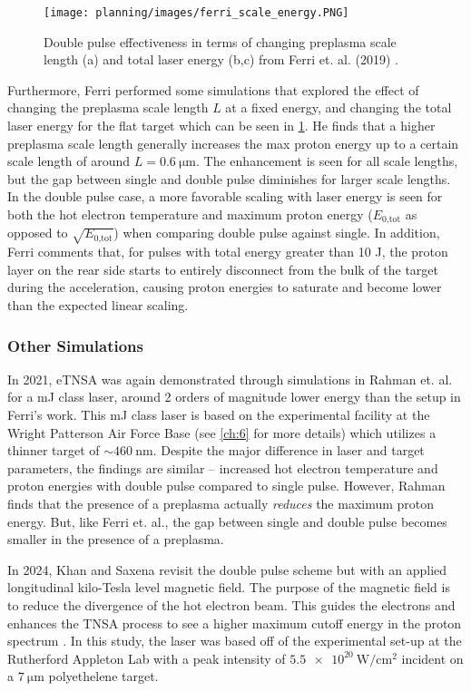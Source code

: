\begin{figure}
	\centering 
	\texttt{[image: planning/images/ferri\_scale\_energy.PNG]}
	\caption{Double pulse effectiveness in terms of changing preplasma scale length (a) and total laser energy (b,c) from Ferri et. al. (2019) \cite{Ferri_2019_Nat_Comm}.}
	\label{fig:ferri_scale_energy}
\end{figure}

Furthermore, Ferri performed some simulations that explored the effect of changing the preplasma scale length $L$ at a fixed energy, and changing the total laser energy for the flat target \cite{Ferri_2019_Nat_Comm} which can be seen in \cref{fig:ferri_scale_energy}. He finds that a higher preplasma scale length generally increases the max proton energy up to a certain scale length of around $L = \SI{0.6}{\micro \meter}$. The enhancement is seen for all scale lengths, but the gap between single and double pulse diminishes for larger scale lengths. In the double pulse case, a more favorable scaling with laser energy is seen for both the hot electron temperature and maximum proton energy ($E_\text{0,tot}$ as opposed to $\sqrt{E_\text{0,tot}}$) when comparing double pulse against single. In addition, Ferri comments that, for pulses with total energy greater than 10 J, the proton layer on the rear side starts to entirely disconnect from the bulk of the target during the acceleration, causing proton energies to saturate and become lower than the expected linear scaling.

\subsubsection{Other Simulations}
In 2021, eTNSA was again demonstrated through simulations in Rahman et. al. \cite{Rahman_2021_PoP} for a mJ class laser, around 2 orders of magnitude lower energy than the setup in Ferri's work. This mJ class laser is based on the experimental facility at the Wright Patterson Air Force Base (see \cref{ch:6} for more details) which utilizes a thinner target of $\sim \SI{460}{\nano \meter}$. Despite the major difference in laser and target parameters, the findings are similar -- increased hot electron temperature and proton energies with double pulse compared to single pulse. However, Rahman finds that the presence of a preplasma actually \emph{reduces} the maximum proton energy. But, like Ferri et. al., the gap between single and double pulse becomes smaller in the presence of a preplasma.

In 2024, Khan and Saxena \cite{Khan_2024_NJoP} revisit the double pulse scheme but with an applied longitudinal kilo-Tesla level magnetic field. The purpose of the magnetic field is to reduce the divergence of the hot electron beam. This guides the electrons and enhances the TNSA process to see a higher maximum cutoff energy in the proton spectrum \cite{Arefiev_2016_NJoP}. In this study, the laser was based off of the experimental set-up at the Rutherford Appleton Lab with a peak intensity of $\SI{5.5e20}{\watt \per \centi \meter \squared}$ incident on a $\SI{7}{\micro \meter}$ polyethelene target. 

